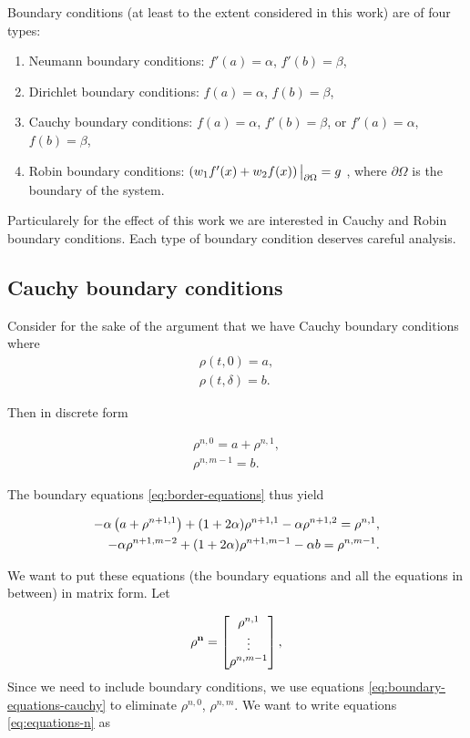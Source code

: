 Boundary conditions (at least to the extent considered in this work) are of four types:

\begin{enumerate}
	\item Neumann boundary conditions: $f'(a) = \alpha$, $f'(b) = \beta$,
	\item Dirichlet boundary conditions: $f(a) = \alpha$, $f(b) = \beta$,
	\item Cauchy boundary conditions: $f(a) = \alpha$, $f'(b) = \beta$, or $f'(a) = \alpha$, $f(b) = \beta$,
	\item Robin boundary conditions: $\left({w_1f'(x) + w_2f(x)}\right)\big|_{\partial\Omega} = g$ , where $\partial\Omega$ is the boundary of the system.
\end{enumerate}

Particularely for the effect of this work we are interested in Cauchy and Robin boundary conditions. Each type of boundary condition deserves careful analysis.

\subsection{Cauchy boundary conditions}
Consider for the sake of the argument that we have Cauchy boundary conditions where 
\begin{align}
	\rho(t,0) = a,\\
	\rho(t,\delta) = b.
\end{align}

Then in discrete form 

\begin{align}
    \rho^{n, 0} = a + \rho^{n, 1}, \\
    \rho^{n, m-1} = b.
\end{align}

The boundary equations \ref{eq:border-equations} thus yield

\begin{align}
	\label{eq:boundary-equations-cauchy}
    -\alpha \left({a + \rho^{n+1, 1}}\right)  + ( 1 + 2\alpha ) \rho^{n+1,1} -\alpha \rho^{n+1,2} = \rho^{n,1},\\
    -\alpha \rho^{n+1,m-2} + ( 1 + 2\alpha ) \rho^{n+1,m-1} - \alpha b = \rho^{n,m-1}.
\end{align}

We want to put these equations (the boundary equations and all the equations in between) in matrix form. Let 

\begin{align}
    \bf{\rho^n} = \begin{bmatrix}
                    \rho^{n, 1} \\
                    \vdots \\
                    \rho^{n, m-1} 
                    \end{bmatrix},
\end{align}
Since we need to include boundary conditions, we use equations \ref{eq:boundary-equations-cauchy} to eliminate $\rho^{n, 0}$, $\rho^{n, m}$. We want to write equations \ref{eq:equations-n} as

